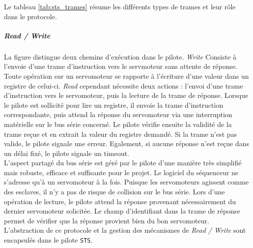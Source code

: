 \vspace{0.1cm}

Le tableau \ref{tab:sts_trames} résume les différents types de trames et leur rôle dans le protocole.

\newpage

\subparagraph*{Read / Write} La figure distingue deux chemins d'exécution dans le pilote. \textit{Write} Consiste à l'envoie d'une
trame d'instruction vers le servmoteur sans attente de réponse. Toute opération sur un servomoteur se rapporte à l'écriture d'une
valeur dans un registre de celui-ci. \textit{Read} cependant nécessite deux actions : l'envoi d'une trame d'instruction vers le
servomoteur, puis la lecture de la trame de réponse. Lorsque le pilote est sollicité pour lire un registre, il envoie la trame
d'instruction correspondante, puis attend la réponse du servomoteur via une interruption matérielle sur le bus série concerné. Le
pilote vérifie ensuite la validité de la trame reçue et en extrait la valeur du registre demandé. Si la trame n'est pas valide, le
pilote signale une erreur. Egalement, si aucune réponse n'est reçue dans un délai fixé, le pilote signale un timeout.\\

L'aspect partagé du bus série est géré par le pilote d'une manière très simplifié mais robuste, efficace et suffisante pour le
projet. Le logiciel du séquenceur ne s'adresse qu'à un servomoteur à la fois. Puisque les servomoteurs agissent comme des
esclaves, il n'y a pas de risque de collision sur le bus série. Lors d'une opération de lecture, le pilote attend la réponse
provenant nécessairement du dernier servomoteur solicitée. Le champ d'identifiant dans la trame de réponse permet de vérifier que
la réponse provient bien du bon servomoteur.\\

L'abstraction de ce protocole et la gestion des mécanismes de \textit{Read / Write} sont encapsulés dans le pilote \texttt{STS}.

\vspace{0.8cm}

